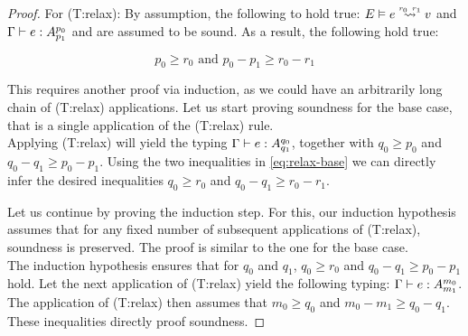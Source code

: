 \begin{proof}
For (T:relax):
By assumption, the following to hold true: \(\evals{E}{e}{v}{r_0}{r_1}\) and \(\Gamma \vdash e : A ^{p_0}_{p_1}\) and are assumed to be sound. As a result, the following hold true: 

\begin{equation}\label{eq:relax-base}
   p_0 \geq r_0 \text{ and } p_0 - p_1 \geq r_0 - r_1
\end{equation}

This requires another proof via induction, as we could have an arbitrarily long chain of (T:relax) applications. Let us start proving soundness for the base case, that is a single application of the (T:relax) rule.\\
Applying (T:relax) will yield the typing \(\Gamma \vdash e : A ^{q_0}_{q_1}\), together with \(q_0 \geq p_0\) and \(q_0 - q_1 \geq p_0 - p_1\). Using the two inequalities in \cref{eq:relax-base} we can directly infer the desired inequalities \(q_0 \geq r_0\) and \(q_0 - q_1 \geq r_0 - r_1\).

Let us continue by proving the induction step. For this, our induction hypothesis assumes that for any fixed number of subsequent applications of (T:relax), soundness is preserved. The proof is similar to the one for the base case.\\
 The induction hypothesis ensures that for \(q_0\) and \(q_1\), \(q_0 \geq r_0\) and \(q_0 - q_1 \geq p_0 - p_1\) hold. Let the next application of (T:relax) yield the following typing: \(\Gamma \vdash e : A ^{m_0}_{m_1}\). The application of (T:relax) then assumes that \(m_0 \geq q_0\) and \(m_0 - m_1 \geq q_0 - q_1\). These inequalities directly proof soundness.
\end{proof}
































